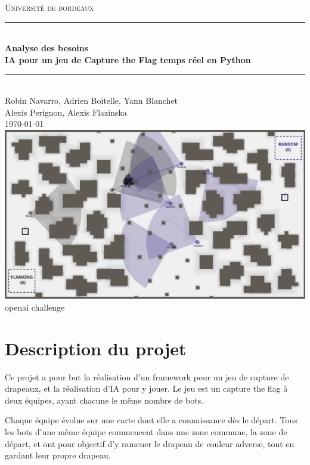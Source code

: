 \documentclass[french]{article}
\begin{document}
\begin{titlepage}
\newcommand{\HRule}{\rule{\linewidth}{0.5mm}}
\center
\textsc{\LARGE
Université de bordeaux
} \\[1cm]

\HRule \\[0.2cm]
{ \huge \bfseries Analyse des besoins \\[0.15cm] }
{ \bfseries IA pour un jeu de Capture the Flag temps réel en Python\\[0.15cm] }
\HRule \\[1.5cm]
Robin Navarro, Adrien Boitelle, Yann Blanchet\\Alexis Perignon, Alexis Flazinska
\\[1cm]
\today \\ [3cm]
\includegraphics[scale=0.3]{data/illustration.png}{\\openai challenge}
\end{titlepage}


\newpage
\Large
\tableofcontents


\normalsize
\newpage
\section{Description du projet}

Ce projet a pour but la réalisation d'un framework pour un jeu de capture de drapeaux, et la réalisation d'IA pour y jouer.
Le jeu est un capture the flag à deux équipes, ayant chacune le même nombre de bots.
\newline

Chaque équipe évolue sur une carte dont elle a connaissance dès le départ. Tous les bots d'une même équipe commencent dans une zone commune, la zone de départ, et ont pour objectif d'y ramener le drapeau de couleur adverse, tout en gardant leur propre drapeau.
\newline
\end{document}
